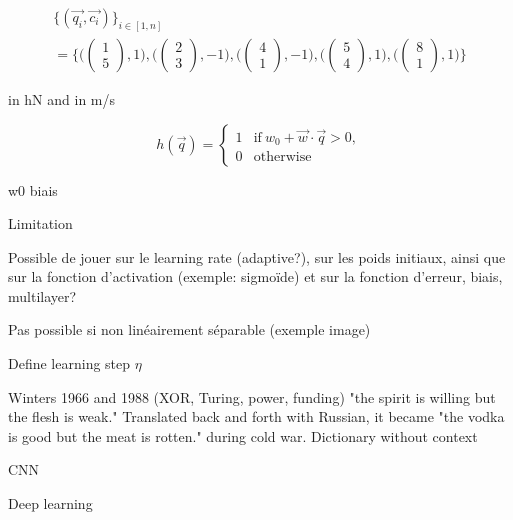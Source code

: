 \begin{multline}
      \biggl\{(\overrightarrow{q_i}, \overrightarrow{c_i})\biggr\}_{i\in [1,n]} \\
      = \Biggl\{ 
      \biggl( \begin{pmatrix} 1 \\ 5 \end{pmatrix}, 1 \biggr),
      \biggl( \begin{pmatrix} 2 \\ 3 \end{pmatrix}, -1 \biggr),
      \biggl( \begin{pmatrix} 4 \\ 1 \end{pmatrix}, -1 \biggr),
      \biggl( \begin{pmatrix} 5 \\ 4 \end{pmatrix}, 1 \biggr),
      \biggl( \begin{pmatrix} 8 \\ 1 \end{pmatrix}, 1 \biggr)
      \Biggr\}
\end{multline}
      
      
in hN and in m/s
      
\begin{equation}
      h(\overrightarrow{q}) = 
      \begin{cases}
      1 & \text{if} \ w_0 + \overrightarrow{w} \cdot \overrightarrow{q} > 0,\\
      0 & \text{otherwise}
      \end{cases}
\end{equation}


w0 biais

Limitation


Possible de jouer sur le learning rate (adaptive?), sur les poids initiaux, ainsi que sur la fonction d'activation (exemple: sigmoïde) et sur la fonction d'erreur, biais, multilayer?

Pas possible si non linéairement séparable (exemple image)

Define learning step $\eta$ 

Winters 1966 and 1988 (XOR, Turing, power, funding)
"the spirit is willing but the flesh is weak." Translated back and forth with Russian, it became "the vodka is good but the meat is rotten." during cold war. Dictionary without context

CNN

Deep learning

